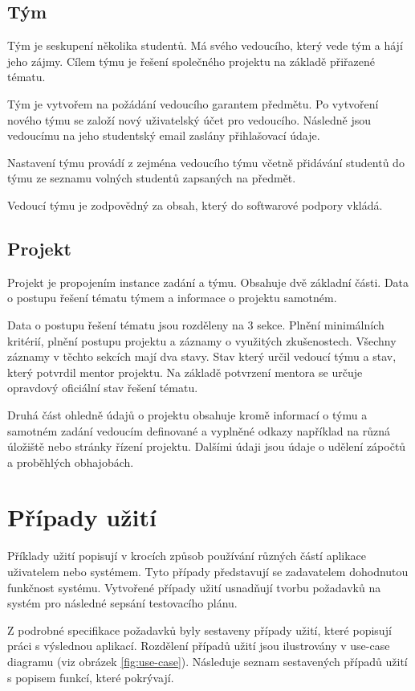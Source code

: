\documentclass[czech,BP]{thesiskiv}
\begin{document}
		\subsection{Tým}
		\par Tým je seskupení několika studentů. Má svého vedoucího, který vede tým a hájí jeho zájmy. Cílem týmu je řešení společného projektu na základě přiřazené tématu.
		\par Tým je vytvořem na požádání vedoucího garantem předmětu. Po vytvoření nového týmu se založí nový uživatelský účet pro vedoucího. Následně jsou vedoucímu na jeho studentský email zaslány přihlašovací údaje.
		\par Nastavení týmu provádí z zejména vedoucího týmu včetně přidávání studentů do týmu ze seznamu volných studentů zapsaných na předmět.
		\par Vedoucí týmu je zodpovědný za obsah, který do softwarové podpory vkládá.
		\subsection{Projekt}
		\par Projekt je propojením instance zadání a týmu. Obsahuje dvě základní části. Data o postupu řešení tématu týmem a informace o projektu samotném. 
		\par Data o postupu řešení tématu jsou rozděleny na 3 sekce. Plnění minimálních kritérií, plnění postupu projektu a záznamy o využitých zkušenostech. Všechny záznamy v těchto sekcích mají dva stavy. Stav který určil vedoucí týmu a stav, který potvrdil mentor projektu. Na základě potvrzení mentora se určuje opravdový oficiální stav řešení tématu.
		\par Druhá část ohledně údajů o projektu obsahuje kromě informací o týmu a samotném zadání vedoucím definované a vyplněné odkazy například na různá úložiště nebo stránky řízení projektu. Dalšími údaji jsou údaje o udělení zápočtů a proběhlých obhajobách.
	\section{Případy užití}
		\par Příklady užití popisují v krocích způsob používání různých částí aplikace uživatelem nebo systémem. Tyto případy představují se zadavatelem dohodnutou funkčnost systému. Vytvořené případy užití usnadňují tvorbu požadavků na systém pro následné sepsání testovacího plánu.
		\par Z podrobné specifikace požadavků byly sestaveny případy užití, které popisují práci s výslednou aplikací. Rozdělení případů užití jsou ilustrovány v use-case diagramu (viz obrázek \ref{fig:use-case}). Následuje seznam sestavených případů užití s popisem funkcí, které pokrývají.
\end{document}
